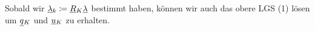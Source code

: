 Sobald wir $ \underline{\lambda}{}_k \coloneqq \underline{R}{}_K \underline{\lambda}{}$ bestimmt haben, können wir auch das obere LGS (1) lösen um $ \underline{q}{}_K $ und $ \underline{u}{}_K $ zu erhalten.







